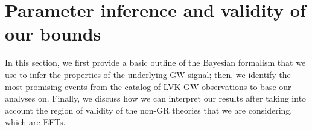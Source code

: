 \documentclass[twocolumn,
               prd,
               aps,
               superscriptaddress,
               tightenlines,
               nofootinbib,
               eqsecnum,
               amsfonts,
               amsmath,
               longbibliography]{revtex4-1}
\begin{document}

\section{Parameter inference and validity of our bounds}
\label{sec:pe}

In this section, we first provide a basic outline of the Bayesian formalism that we use to
infer the properties of the underlying GW signal; then, we identify the most promising
events from the catalog of LVK GW observations to base our analyses on. Finally,
we discuss how we can interpret our results after taking into account the region of validity of
the non-GR theories that we are considering, which are EFTs.
\end{document}
